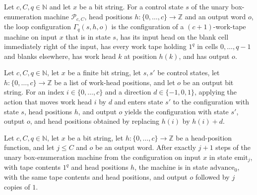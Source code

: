 \begin{definition}
\label{Complexity.polyCfg}
\leanok
{}
Let $c, C, q \in \mathbb{N}$ and let $x$ be a bit string. For a control state $s$ of the unary box-enumeration machine $\mathcal{P}_{c,C}$, head positions $h \colon \{0,\dots,c\} \to \mathbb{Z}$ and an output word $o$, the loop configuration $\Gamma_q(s,h,o)$ is the configuration of a $(c+1)$-work-tape machine on input $x$ that is in state $s$, has its input head on the blank cell immediately right of the input, has every work tape holding $1^q$ in cells $0,\dots,q-1$ and blanks elsewhere, has work head $k$ at position $h(k)$, and has output $o$.
\end{definition}

\begin{lemma}
\label{Complexity.polyMove_apply}
\leanok
{}
Let $c,C,q\in\mathbb{N}$, let $x$ be a finite bit string, let $s,s'$ be control states,
let $h:\{0,\ldots,c\}\to\mathbb{Z}$ be a list of work-head positions, and let $o$ be an
output bit string. For an index $i\in\{0,\ldots,c\}$ and a direction $d\in\{-1,0,1\}$,
applying the action that moves work head $i$ by $d$ and enters state $s'$ to the
configuration with state $s$, head positions $h$, and output $o$ yields the
configuration with state $s'$, output $o$, and head positions obtained by replacing
$h(i)$ by $h(i)+d$.
\end{lemma}

\begin{lemma}
\label{Complexity.poly_emit}
\leanok
{}
Let $c,C,q\in\mathbb{N}$, let $x$ be a bit string, let $h:\{0,\ldots,c\}\to\mathbb{Z}$
be a head-position function, and let $j\le C$ and $o$ be an output word. After exactly
$j+1$ steps of the unary box-enumeration machine from the configuration on input $x$ in
state $\mathrm{emit}_j$, with tape contents $1^q$ and head positions $h$, the machine is
in state $\mathrm{advance}_0$, with the same tape contents and head positions, and
output $o$ followed by $j$ copies of $1$.
\end{lemma}

